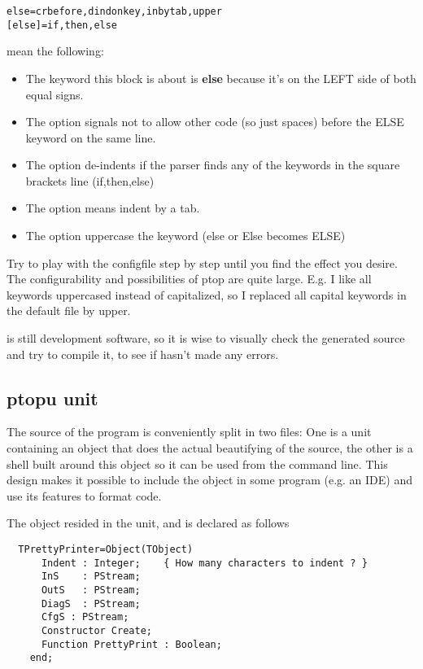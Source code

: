 \begin{verbatim}
else=crbefore,dindonkey,inbytab,upper
[else]=if,then,else
\end{verbatim}

mean the following:

\begin{itemize}
\item The keyword this block is about is \textbf{else} because it's on the LEFT side
of both equal signs.
\item The option  signals not to allow other code (so just spaces)
before the ELSE keyword on the same line.
\item The option  de-indents if the parser finds any of the keywords
 in the square brackets line (if,then,else)
\item The option  means indent by a tab.
\item The option  uppercase the keyword (else or Else becomes ELSE)
\end{itemize}

Try to play with the configfile step by step until you find the effect you desire.
The configurability and possibilities of ptop are quite large. E.g. I like all
keywords uppercased instead of capitalized, so I replaced all capital keywords in
the default file by upper.

 is still development software, so it is wise to visually check the generated
source and try to compile it, to see if  hasn't made any errors.

\subsection{ptopu unit}

The source of the  program is conveniently split in two files:
One is a unit containing an object that does the actual beautifying of the
source, the other is a shell built around this object so it can be used
from the command line. This design makes it possible to include the object
in some program (e.g. an IDE) and use its features to format code.

The object resided in the  unit, and is declared as follows
\begin{verbatim}
  TPrettyPrinter=Object(TObject)
      Indent : Integer;    { How many characters to indent ? }
      InS    : PStream;
      OutS   : PStream;
      DiagS  : PStream;
      CfgS : PStream;
      Constructor Create;
      Function PrettyPrint : Boolean;
    end;
\end{verbatim}

